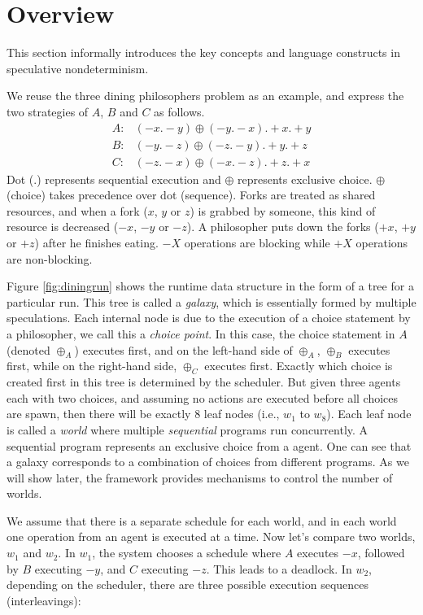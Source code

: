 \section{Overview}\label{sec:overview}

This section informally introduces the key concepts and language constructs
in speculative nondeterminism.



We reuse the three dining philosophers problem as an example, 
and express the two strategies of $A$, $B$ and $C$ as follows.
\begin{eqnarray}
A: & (-x.-y)\oplus(-y.-x).+x.+y \label{eqn:a}\\
B: & (-y.-z)\oplus(-z.-y).+y.+z \label{eqn:b}\\
C: & (-z.-x)\oplus(-x.-z).+z.+x \label{eqn:c}
\end{eqnarray}
Dot ($.$) represents sequential execution and $\oplus$ represents exclusive choice. 
$\oplus$ (choice) takes precedence over dot (sequence).
Forks are treated as shared resources, and when a fork ($x$, $y$ or $z$) is 
grabbed by someone, this kind of resource is decreased ($-x$, $-y$ or $-z$). 
A philosopher puts down the forks ($+x$, $+y$ or $+z$) after he finishes eating.
$-X$ operations are blocking while $+X$ operations are non-blocking.

Figure \ref{fig:diningrun} shows the runtime data structure in
the form of a tree for a particular run. 
This tree is called a \emph{galaxy}, which is essentially 
formed by multiple speculations.
Each internal node is due to the execution of a choice
statement by a philosopher, we call this a {\em choice point}.
In this case, the choice statement in $A$ (denoted $\oplus_A$) 
executes first, and on the left-hand side of $\oplus_A$, 
$\oplus_B$ executes first, while on the right-hand side, 
$\oplus_C$ executes first.
Exactly which choice is created first in this tree is determined by
the scheduler. But given three agents each with two choices, 
and assuming no actions are executed before all choices are spawn,
then there will be exactly 8 leaf nodes (i.e., $w_1$ to $w_8$). 
Each leaf node is called a \emph{world}
where multiple {\em sequential} programs run concurrently.
A sequential program represents an exclusive choice from a agent. 
One can see that a galaxy corresponds to 
a combination of choices from different programs.
As we will show later, the framework provides mechanisms to
control the number of worlds.

We assume that there is a separate schedule for each world,
and in each world one operation from an agent is executed at a time.
Now let's compare two worlds, $w_1$ and $w_2$.
In $w_1$, the system chooses a schedule
where $A$ executes $-x$, followed by
$B$ executing $-y$, and $C$ executing $-z$. This leads to a deadlock.
In $w_2$, depending on the scheduler, there are
three possible execution sequences (interleavings): 

